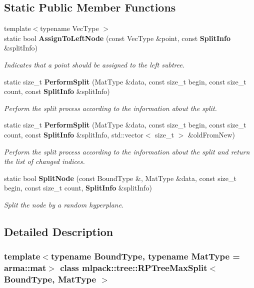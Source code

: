 \subsection*{Static Public Member Functions}
\begin{DoxyCompactItemize}
\item 
{\footnotesize template$<$typename Vec\+Type $>$ }\\static bool \textbf{ Assign\+To\+Left\+Node} (const Vec\+Type \&point, const \textbf{ Split\+Info} \&split\+Info)
\begin{DoxyCompactList}\small\item\em Indicates that a point should be assigned to the left subtree. \end{DoxyCompactList}\item 
static size\+\_\+t \textbf{ Perform\+Split} (Mat\+Type \&data, const size\+\_\+t begin, const size\+\_\+t count, const \textbf{ Split\+Info} \&split\+Info)
\begin{DoxyCompactList}\small\item\em Perform the split process according to the information about the split. \end{DoxyCompactList}\item 
static size\+\_\+t \textbf{ Perform\+Split} (Mat\+Type \&data, const size\+\_\+t begin, const size\+\_\+t count, const \textbf{ Split\+Info} \&split\+Info, std\+::vector$<$ size\+\_\+t $>$ \&old\+From\+New)
\begin{DoxyCompactList}\small\item\em Perform the split process according to the information about the split and return the list of changed indices. \end{DoxyCompactList}\item 
static bool \textbf{ Split\+Node} (const Bound\+Type \&, Mat\+Type \&data, const size\+\_\+t begin, const size\+\_\+t count, \textbf{ Split\+Info} \&split\+Info)
\begin{DoxyCompactList}\small\item\em Split the node by a random hyperplane. \end{DoxyCompactList}\end{DoxyCompactItemize}


\subsection{Detailed Description}
\subsubsection*{template$<$typename Bound\+Type, typename Mat\+Type = arma\+::mat$>$\newline
class mlpack\+::tree\+::\+R\+P\+Tree\+Max\+Split$<$ Bound\+Type, Mat\+Type $>$}

